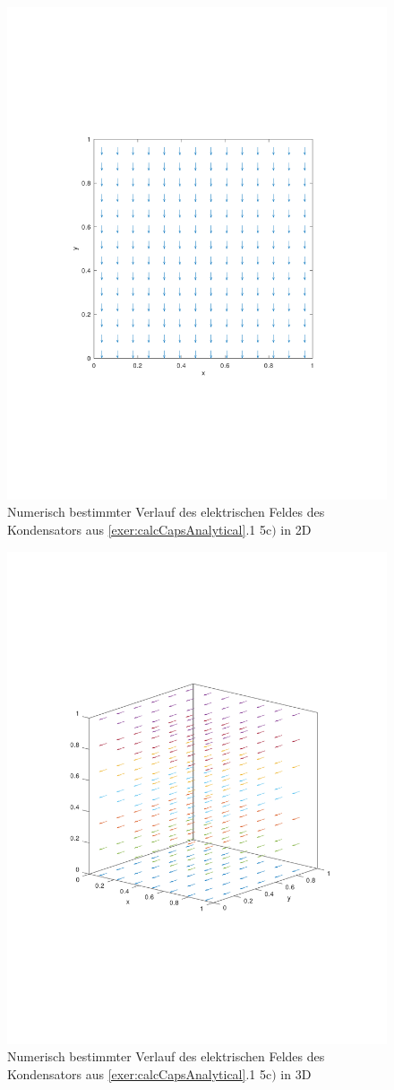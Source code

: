 \documentclass[Protokollheft.tex]{subfiles}
\begin{document}
\begin{figure}[h!]
	\centering
	\includegraphics[trim = 20mm 70mm 20mm 70mm, clip,width=0.7\linewidth]{E_2D_C.pdf}
	\caption{Numerisch bestimmter Verlauf des elektrischen Feldes des Kondensators aus \ref{exer:calcCapsAnalytical}.1 5c$)$ in 2D}
\end{figure}

\begin{figure}[h!]
	\centering
	\includegraphics[trim = 20mm 70mm 20mm 70mm, clip,width=0.7\linewidth]{E_3D_C.pdf}
	\caption{Numerisch bestimmter Verlauf des elektrischen Feldes des Kondensators aus \ref{exer:calcCapsAnalytical}.1 5c$)$ in 3D}
\end{figure}
\end{document}
